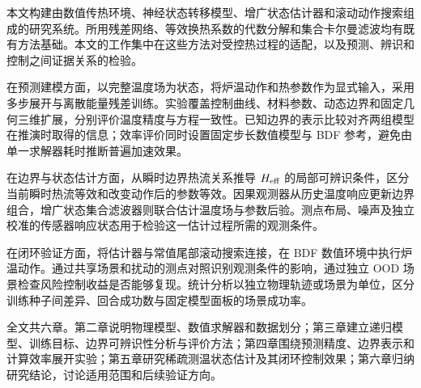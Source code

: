 
本文构建由数值传热环境、神经状态转移模型、增广状态估计器和滚动动作搜索组成的研究系统。所用残差网络、等效换热系数的代数分解和集合卡尔曼滤波均有既有方法基础。本文的工作集中在这些方法对受控热过程的适配，以及预测、辨识和控制之间证据关系的检验。

在预测建模方面，以完整温度场为状态，将炉温动作和热参数作为显式输入，采用多步展开与离散能量残差训练。实验覆盖控制曲线、材料参数、动态边界和固定几何三维扩展，分别评价温度精度与方程一致性。已知边界的表示比较对齐两组模型在推演时取得的信息；效率评价同时设置固定步长数值模型与 BDF 参考，避免由单一求解器耗时推断普遍加速效果。

在边界与状态估计方面，从瞬时边界热流关系推导 ${H_{\mathrm{eff}}}$ 的局部可辨识条件，区分当前瞬时热流等效和改变动作后的参数等效。因果观测器从历史温度响应更新边界组合，增广状态集合滤波器则联合估计温度场与参数后验。测点布局、噪声及独立校准的传感器响应状态用于检验这一估计过程所需的观测条件。

在闭环验证方面，将估计器与常值尾部滚动搜索连接，在 BDF 数值环境中执行炉温动作。通过共享场景和扰动的测点对照识别观测条件的影响，通过独立 OOD 场景检查风险控制收益是否能够复现。统计分析以独立物理轨迹或场景为单位，区分训练种子间差异、回合成功数与固定模型面板的场景成功率。

全文共六章。第二章说明物理模型、数值求解器和数据划分；第三章建立递归模型、训练目标、边界可辨识性分析与评价方法；第四章围绕预测精度、边界表示和计算效率展开实验；第五章研究稀疏测温状态估计及其闭环控制效果；第六章归纳研究结论，讨论适用范围和后续验证方向。
